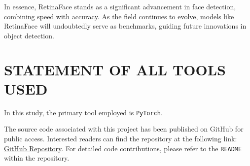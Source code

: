 \documentclass{article}
\begin{document}
In essence, RetinaFace stands as a significant advancement in face detection, combining speed with accuracy. As the field continues to evolve, models like RetinaFace will undoubtedly serve as benchmarks, guiding future innovations in object detection.


\section{STATEMENT OF ALL TOOLS USED}
\label{sec:statementofalltoolsused}

In this study, the primary tool employed is \texttt{PyTorch}.

The source code associated with this project has been published on GitHub for public access. 
Interested readers can find the repository at the following link: \href{https://github.com/felixzhao/AIML425-Project}{GitHub Repository}. 
For detailed code contributions, please refer to the \texttt{README} within the repository.




\vfill\pagebreak



\end{document}
